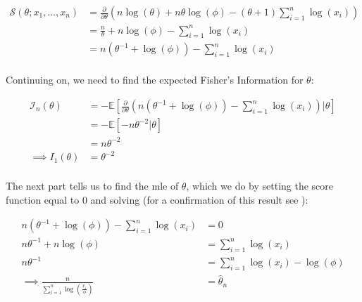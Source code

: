 \documentclass{report}
\begin{document}
\begin{equation}\label{eq:ex-ols-pareto-score-function}
    \begin{aligned}
        \mathcal{S}(\theta; x_1, \dots, x_n)
          &= \frac{\partial}{\partial\theta}\left(n\log(\theta) + n\theta\log(\phi) -(\theta + 1) \sum_{i=1}^n \log(x_i)\right) \\
          &= \frac{n}{\theta} + n\log(\phi) - \sum_{i=1}^n \log(x_i) \\
          &= n \left(\theta^{-1} + \log(\phi)\right) - \sum_{i=1}^n \log(x_i) \\
    \end{aligned}
\end{equation}

Continuing on, we need to find the expected Fisher's Information for $\theta$:

\begin{equation}\label{eq:ex-ols-pareto-fishers-information}
    \begin{aligned}
        \mathcal{I}_n(\theta)
          &= -\mathbb{E}\left[\frac{\partial}{\partial\theta} \left(n \left(\theta^{-1} + \log(\phi)\right) - \sum_{i=1}^n \log(x_i)\right) \bigg | \theta\right] \\
          &= -\mathbb{E}\left[-n\theta^{-2} | \theta\right] \\
          &= n\theta^{-2} \\
        \implies I_1(\theta) &= \theta^{-2} \\
    \end{aligned}
\end{equation}

The next part tells us to find the \gls{mle} of $\theta$, which we do by setting the score function equal to 0 and solving (for a confirmation of this result see \cite{rytgaard_estimation_1990}):

\begin{equation}\label{eq:ex-ols-pareto-theta-mle}
    \begin{aligned}
        n \left(\theta^{-1} + \log(\phi)\right) - \sum_{i=1}^n \log(x_i) &= 0 \\
        n\theta^{-1} + n\log(\phi) &= \sum_{i=1}^n \log(x_i) \\
        n\theta^{-1} &= \sum_{i=1}^n \log(x_i) - \log(\phi) \\
        \implies \frac{n}{\sum_{i=1}^n \log\left(\frac{x_i}{\phi}\right)} &= \hat{\theta}_n \\
    \end{aligned}
\end{equation}
\end{document}
